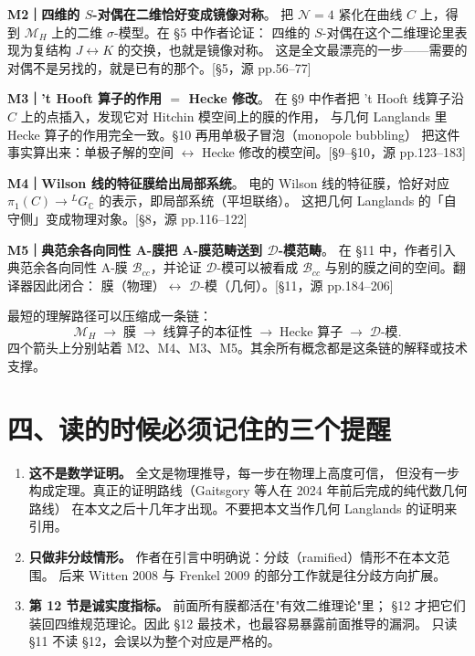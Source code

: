 \documentclass[11pt,a4paper]{article}
\newcommand{\MH}{\mathcal{M}_H}
\newcommand{\LdualC}{{}^L\!G_{\mathbb{C}}}
\newcommand{\Nfour}{\mathcal{N}=4}
\newcommand{\src}[1]{{\color{gray!70}\footnotesize[#1]}}
\begin{document}
\smallskip
\textbf{M2｜四维的 $S$-对偶在二维恰好变成镜像对称}。%
把 $\Nfour$ 紧化在曲线 $C$ 上，得到 $\MH$ 上的二维 $\sigma$-模型。在 \S5 中作者论证：
四维的 $S$-对偶在这个二维理论里表现为复结构 $J\leftrightarrow K$ 的交换，也就是镜像对称。
这是全文最漂亮的一步——需要的对偶不是另找的，就是已有的那个。\src{\S5，源 pp.56--77}

\smallskip
\textbf{M3｜'t Hooft 算子的作用 $=$ Hecke 修改}。%
在 \S9 中作者把 't Hooft 线算子沿 $C$ 上的点插入，发现它对 Hitchin 模空间上的膜的作用，
与几何 Langlands 里 Hecke 算子的作用完全一致。\S10 再用单极子冒泡（monopole bubbling）
把这件事实算出来：单极子解的空间 $\leftrightarrow$ Hecke 修改的模空间。\src{\S9--\S10，源 pp.123--183}

\smallskip
\textbf{M4｜Wilson 线的特征膜给出局部系统}。%
电的 Wilson 线的特征膜，恰好对应 $\pi_1(C)\to\LdualC$ 的表示，即局部系统（平坦联络）。
这把几何 Langlands 的「自守侧」变成物理对象。\src{\S8，源 pp.116--122}

\smallskip
\textbf{M5｜典范余各向同性 A-膜把 A-膜范畴送到 $\mathcal{D}$-模范畴}。%
在 \S11 中，作者引入典范余各向同性 A-膜 $\mathcal{B}_{cc}$，并论证
$\mathcal{D}$-模可以被看成 $\mathcal{B}_{cc}$ 与别的膜之间的空间。翻译器因此闭合：
膜（物理）$\longleftrightarrow$ $\mathcal{D}$-模（几何）。\src{\S11，源 pp.184--206}

最短的理解路径可以压缩成一条链：
\[
\MH \;\longrightarrow\; \text{膜} \;\longrightarrow\; \text{线算子的本征性}
\;\longrightarrow\; \text{Hecke 算子} \;\longrightarrow\; \mathcal{D}\text{-模}.
\]
四个箭头上分别站着 M2、M4、M3、M5。其余所有概念都是这条链的解释或技术支撑。

\section*{四、读的时候必须记住的三个提醒}

\begin{enumerate}[label=\textbf{\arabic*.}]
  \item \textbf{这不是数学证明。} 全文是物理推导，每一步在物理上高度可信，
        但没有一步构成定理。真正的证明路线（Gaitsgory 等人在 2024 年前后完成的纯代数几何路线）
        在本文之后十几年才出现。不要把本文当作几何 Langlands 的证明来引用。
  \item \textbf{只做非分歧情形。} 作者在引言中明确说：分歧（ramified）情形不在本文范围。
        后来 Witten 2008 与 Frenkel 2009 的部分工作就是往分歧方向扩展。
  \item \textbf{第 12 节是诚实度指标。} 前面所有膜都活在"有效二维理论"里；
        \S12 才把它们装回四维规范理论。因此 \S12 最技术，也最容易暴露前面推导的漏洞。
        只读 \S11 不读 \S12，会误以为整个对应是严格的。
\end{enumerate}
\end{document}
